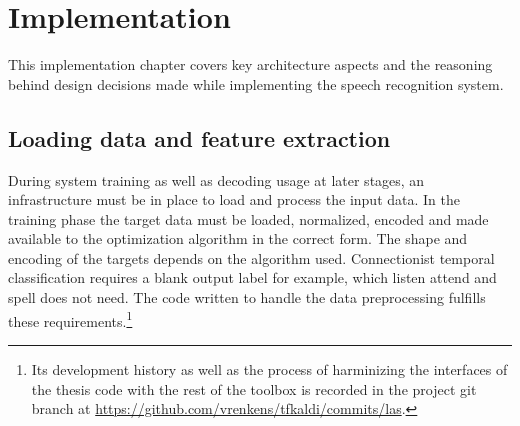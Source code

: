 \chapter{Implementation}
This implementation chapter covers key architecture aspects and the reasoning behind design decisions made while implementing the speech recognition system. 

\section{Loading data and feature extraction}
During system training as well as decoding usage at later stages, an infrastructure must be in place to load and process the input data. In the training phase the target data must be loaded, normalized, encoded and made available to the optimization algorithm in the correct form. The shape and encoding of the targets depends on the algorithm used. Connectionist temporal classification requires a blank output label for example, which listen attend and spell does not need.
The code written to handle the data preprocessing fulfills these requirements.\footnote{Its development history as well as the process of harminizing the interfaces of the thesis code with the rest of the toolbox is recorded in the project git branch at \url{https://github.com/vrenkens/tfkaldi/commits/las}.}

